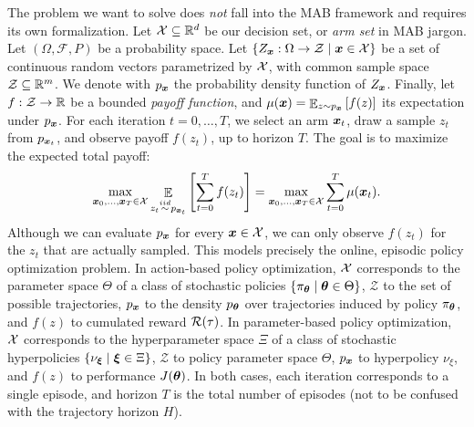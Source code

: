 \documentclass{article}
\begin{document}
The problem we want to solve does \textit{not} fall into the MAB framework and requires its own formalization. Let $\mathcal{X}\subseteq \mathbb{R}^d$ be our decision set, or \textit{arm set} in MAB jargon. Let $(\Omega,\mathcal{F},P)$ be a probability space. Let ${\{Z_{\boldsymbol{x}}:\Omega\to\mathcal{Z}\mid \boldsymbol{x}\in\mathcal{X}\}}$ be a set of continuous random vectors parametrized by $\mathcal{X}$, with common sample space ${\mathcal{Z}\subseteq \mathbb{R}^m}$. We denote with $p_{\boldsymbol{x}}$ the probability density function of $Z_{\boldsymbol{x}}$. Finally, let $f:\mathcal{Z}\to\mathbb{R}$ be a bounded \textit{payoff function}, and $\mu(\boldsymbol{x}) = \mathop{\mathbb{E}}_{z\sim p_{\boldsymbol{x}}}\left[f(z)\right]$ its expectation under $p_{\boldsymbol{x}}$. For each iteration $t=0,\dots,T$, we select an arm $\boldsymbol{x}_t$, draw a sample $z_t$ from $p_{\boldsymbol{x}_t}$, and observe payoff $f(z_t)$, up to horizon $T$. The goal is to maximize the expected total payoff:
\begin{align}\label{eq:theproblem}
	\max_{\boldsymbol{x}_0,\dots,\boldsymbol{x}_T\in\mathcal{X}} \mathop{\mathbb{E}}_{z_t\stackrel{iid}{\sim} p_{\boldsymbol{x}_t}}\left[\sum_{t=0}^T f(z_t)\right] = \max_{\boldsymbol{x}_0,\dots,\boldsymbol{x}_T\in\mathcal{X}}\sum_{t=0}^{T}\mu(\boldsymbol{x}_t).
\end{align}
Although we can evaluate $p_{\boldsymbol{x}}$ for every $\boldsymbol{x}\in\mathcal{X}$, we can only observe $f(z_t)$ for the $z_t$ that are actually sampled. 
This models precisely the online, episodic policy optimization problem.
In action-based policy optimization, $\mathcal{X}$ corresponds to the parameter space $\Theta$ of a class of stochastic policies ${\{\pi_{\boldsymbol{\theta}}\mid\boldsymbol{\theta}\in\Theta\}}$, $\mathcal{Z}$ to the set of possible trajectories, $p_{\boldsymbol{x}}$ to the density $p_{\boldsymbol{\theta}}$ over trajectories induced by policy $\pi_{\boldsymbol{\theta}}$, and $f(z)$ to cumulated reward $\mathcal{R}(\tau)$. 
In parameter-based policy optimization, $\mathcal{X}$ corresponds to the hyperparameter space $\Xi$ of a class of stochastic hyperpolicies $\{\nu_{\boldsymbol{\xi}}\mid\boldsymbol{\xi}\in\Xi\}$, $\mathcal{Z}$ to policy parameter space $\Theta$, $p_{\boldsymbol{x}}$ to hyperpolicy $\nu_{\xi}$, and $f(z)$ to performance $J(\boldsymbol{\theta})$. In both cases, each iteration corresponds to a single episode, and horizon $T$ is the total number of episodes (not to be confused with the trajectory horizon $H$).
\end{document}
